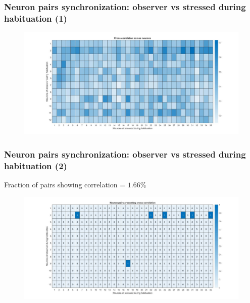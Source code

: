 \documentclass{beamer}
\begin{document}
\begin{frame}
\frametitle{Neuron pairs synchronization: observer vs stressed during habituation (1)}





\begin{figure}[H]
	\begin{center}
		\hspace*{-1cm}
		\includegraphics[scale=.30]{cc_heatmap2.jpg} 
	\end{center}  
	
	
\end{figure}


\end{frame}	




\begin{frame}
\frametitle{Neuron pairs synchronization: observer vs stressed during habituation (2)}


Fraction of pairs showing correlation = $1.66 \%$


\begin{figure}[H]
\begin{center}
	\hspace*{-1cm}
	\includegraphics[scale=.30]{cc_active2.jpg} 
\end{center}  


\end{figure}


\end{frame}	
\end{document}
